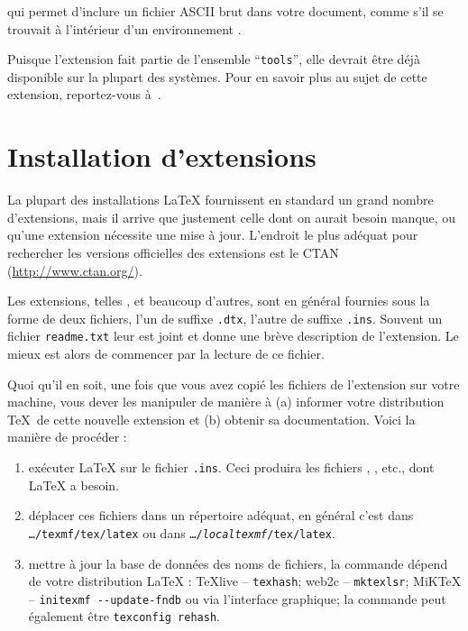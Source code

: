 \noindent qui permet d'inclure un fichier ASCII brut dans votre
document, comme s'il se trouvait à l'intérieur d'un environnement
.

Puisque l'extension  fait partie de l'ensemble
\enquote{\texttt{tools}}, elle devrait être déjà disponible sur la plupart
des systèmes. Pour en savoir plus au sujet de cette extension,
reportez-vous à~\cite{verbatim}.

\section{Installation d'extensions}
\label{sec:Packages}

La plupart des  installations \LaTeX{} fournissent en standard un grand
nombre d'extensions, mais il arrive que justement celle dont on aurait
besoin manque, ou qu'une extension nécessite une mise à jour.
L'endroit le plus adéquat pour rechercher les versions officielles
des  extensions est le CTAN (\url{http://www.ctan.org/}).

Les extensions, telles ,  et beaucoup
d'autres, sont en général fournies sous la forme de deux fichiers, l'un
de suffixe \texttt{.dtx}, l'autre de suffixe \texttt{.ins}.  Souvent
un fichier \texttt{readme.txt} leur est joint et donne une brève
description de l'extension. Le mieux est alors de commencer par la
lecture de ce fichier.

Quoi qu'il en soit, une fois que vous avez copié les fichiers de
l'extension sur votre machine, vous dever les manipuler de manière à
(a) informer votre distribution \TeX\ de cette nouvelle extension et
(b) obtenir sa documentation. Voici la manière de procéder :

\begin{enumerate}
\item exécuter \LaTeX{} sur le fichier \texttt{.ins}. Ceci produira les
  fichiers , , etc., dont \LaTeX{} a besoin.
\item déplacer ces fichiers dans un répertoire adéquat, en général
  c'est dans \texttt{\ldots/texmf/tex/latex} ou dans
  \texttt{\ldots/\emph{localtexmf}/tex/latex}.
\item mettre à jour la base de données des noms de fichiers, la commande
  dépend de votre distribution \LaTeX{} :
  \TeX{}live -- \texttt{texhash}; web2c -- \texttt{mktexlsr};
  MiK\TeX{} -- \texttt{initexmf -{}-update-fndb} ou via l'interface
  graphique; la commande peut également être \texttt{texconfig rehash}.
\end{enumerate}

